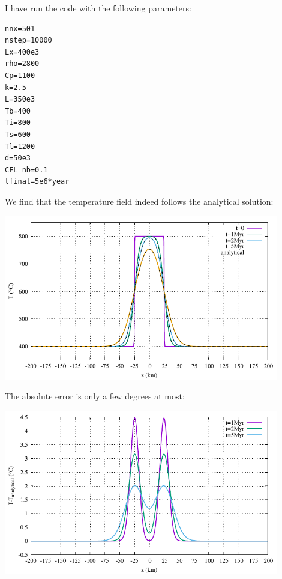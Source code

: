I have run the code with the following parameters:
\begin{lstlisting}
nnx=501
nstep=10000
Lx=400e3
rho=2800
Cp=1100
k=2.5
L=350e3
Tb=400
Ti=800
Ts=600
Tl=1200
d=50e3
CFL_nb=0.1
tfinal=5e6*year
\end{lstlisting}
We find that the temperature field indeed follows the analytical solution:
\begin{center}
\includegraphics[width=12cm]{python_codes/fieldstone_169/results/linear/T.pdf}
\end{center}
The absolute error is only a few degrees at most:
\begin{center}
\includegraphics[width=12cm]{python_codes/fieldstone_169/results/linear/T_error.pdf}
\end{center}






